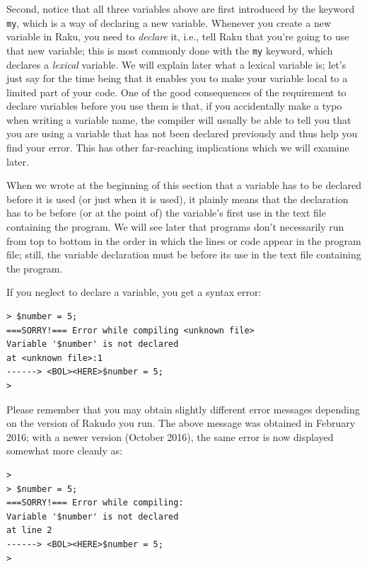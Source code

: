 Second, notice that all three variables above are first 
introduced by the keyword {\tt my}, which is a way of 
declaring a new variable. Whenever you create a new 
variable in Raku, you need to \emph{declare} it, 
i.e., tell Raku that you're going to use that new 
variable; this is most commonly done with the 
{\tt my} keyword, which declares a \emph{lexical} variable. 
We will explain later what a lexical variable is; let's 
just say for the time being that it enables you to 
make your variable local to a limited part of your code. 
One of the good consequences of the requirement to declare 
variables before you use them is that, if you accidentally 
make a typo when writing a variable name, the compiler 
will usually be able to tell you that you are using a 
variable that has not been declared previously and 
thus help you find your error. This has other far-reaching 
implications which we will examine later.

When we wrote at the beginning of this section that a variable has 
to be declared before it is used (or just when it is used), it plainly 
means that the declaration has to be before (or at the point of) the 
variable's first use in the text file containing the program. We will see later that 
programs don't necessarily run from top to bottom in the order in which 
the lines or code appear in the program file; still, the variable 
declaration must be before its use in the text file containing the program.

If you neglect to declare a variable, you get a syntax error:

\begin{verbatim}
> $number = 5;
===SORRY!=== Error while compiling <unknown file>
Variable '$number' is not declared
at <unknown file>:1
------> <BOL><HERE>$number = 5;
>
\end{verbatim}
%
Please remember that you may obtain slightly different 
error messages depending on the version of Rakudo you 
run. The above message was obtained in February 2016; 
with a newer version (October 2016), the same error 
is now displayed somewhat more cleanly as:
\begin{verbatim}
>
> $number = 5;
===SORRY!=== Error while compiling:
Variable '$number' is not declared
at line 2
------> <BOL><HERE>$number = 5;
>
\end{verbatim}


